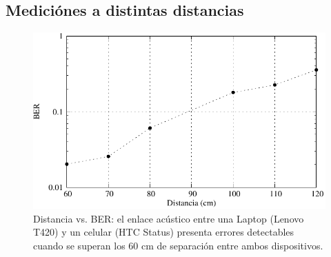 %

\subsection{Mediciónes a distintas distancias}

\begin{figure}[t]
  \centering
    \includegraphics[width=5in]{graphs/mediciones-distancia-fig7.pdf}
\caption {Distancia vs. BER: el enlace acústico entre una Laptop (Lenovo T420) y un celular (HTC Status) presenta errores detectables cuando se superan los 60 cm de separación entre ambos dispositivos.}
\label{fig:acudist}
\end{figure}

